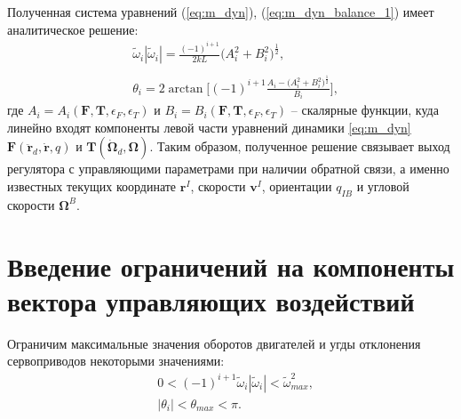 Полученная система уравнений (\ref{eq:m_dyn}), (\ref{eq:m_dyn_balance_1}) имеет аналитическое решение:
\begin{equation} \label{eq:m_dyn_resolve}
\begin{aligned}
&\tilde\omega_i |\tilde\omega_i| =
\frac{(-1)^{i+1}}{2kL}\Big(
A^2_i + 
B^2_i
\Big)^{\frac{1}{2}},
\\
\phantom{}
\\
&\theta_i = 
2 \arctan \Bigg[(-1)^{i+1}	
\frac{A_i -
\Big(A^2_i +
B^2_i
\Big)^{\frac{1}{2}}}
{B_i}
\Bigg],
\end{aligned}
\end{equation}
где $A_i = A_i(\bm F, \bm T, \epsilon_F, \epsilon_T)$
и
$B_i = B_i(\bm F, \bm T, \epsilon_F, \epsilon_T)$
-- скалярные функции, куда линейно входят компоненты левой части уравнений динамики \eqref{eq:m_dyn}
$\bm F(\ddot{\bm r}_d, \dot{\bm r}, q)$
и
$\bm T(\dot{\bm \Omega}_d, \bm\Omega)$.
Таким образом, полученное решение связывает выход регулятора с управляющими параметрами при наличии обратной связи, а именно известных текущих координате $\bm r^I$, скорости $\bm v^I$, ориентации $q_{IB}$ и угловой скорости $\bm \Omega^B$.


\section{Введение ограничений на компоненты вектора управляющих воздействий}
\label{section:limits}

Ограничим максимальные значения оборотов двигателей и угды отклонения сервоприводов некоторыми значениями:
\begin{equation} \label{eq:m_limits_init}
\begin{aligned}
&0< (-1)^{i+1} \tilde \omega_i |\tilde\omega_i| < \tilde \omega_{max}^2,
\\
&|\theta_i| < \theta_{max} < \pi.
\end{aligned}
\end{equation}

